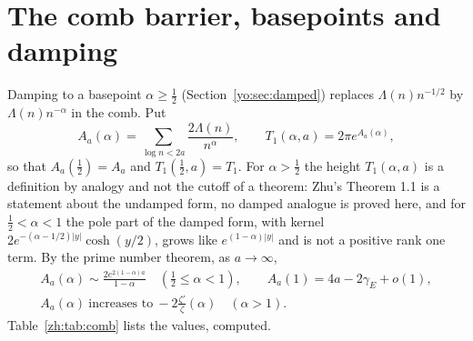 \section{The comb barrier, basepoints and damping}\label{zh:sec:comb}

Damping to a basepoint $\alpha\ge\frac12$ (Section~\ref{yo:sec:damped}) replaces $\Lambda(n)n^{-1/2}$ by $\Lambda(n)n^{-\alpha}$ in the comb. Put
\begin{equation}\label{zh:eq:Aa}
A_a(\alpha)=\sum_{\log n<2a}\frac{2\Lambda(n)}{n^{\alpha}},\qquad T_1(\alpha,a)=2\pi e^{A_a(\alpha)},
\end{equation}
so that $A_a(\frac12)=A_a$ and $T_1(\frac12,a)=T_1$. For $\alpha>\frac12$ the height $T_1(\alpha,a)$ is a definition by analogy and not the cutoff of a theorem: Zhu's Theorem 1.1 is a statement about the undamped form, no damped analogue is proved here, and for $\frac12<\alpha<1$ the pole part of the damped form, with kernel $2e^{-(\alpha-1/2)|y|}\cosh(y/2)$, grows like $e^{(1-\alpha)|y|}$ and is not a positive rank one term. By the prime number theorem, as $a\to\infty$,
\begin{equation}\label{zh:eq:trichotomy}
\begin{gathered}
A_a(\alpha)\sim\frac{2e^{2(1-\alpha)a}}{1-\alpha}\quad(\tfrac12\le\alpha<1),\qquad A_a(1)=4a-2\gamma_E+o(1),\\
A_a(\alpha)\ \text{increases to}\ -2\frac{\zeta'}{\zeta}(\alpha)\quad(\alpha>1).
\end{gathered}
\end{equation}
Table~\ref{zh:tab:comb} lists the values, computed.

